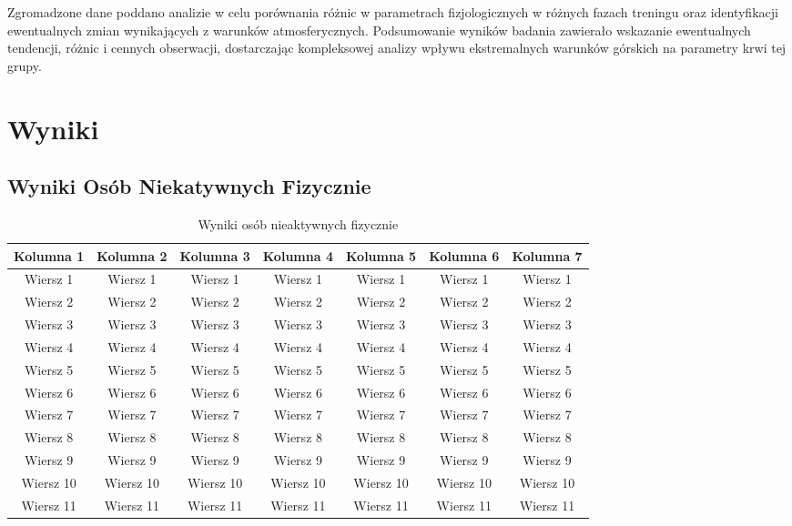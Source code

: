 Zgromadzone dane poddano analizie w celu porównania różnic w parametrach fizjologicznych w różnych fazach treningu oraz identyfikacji ewentualnych zmian wynikających z warunków atmosferycznych. Podsumowanie wyników badania zawierało wskazanie ewentualnych tendencji, różnic i cennych obserwacji, dostarczając kompleksowej analizy wpływu ekstremalnych warunków górskich na parametry krwi tej grupy.

\section{Wyniki}
\subsection{Wyniki Osób Niekatywnych Fizycznie}
\begin{table}[ht]
    \centering
    \caption{Wyniki osób nieaktywnych fizycznie}
    \label{tab:my-table}
    \begin{tabular}{|c|c|c|c|c|c|c|}
    \hline
    Kolumna 1 & Kolumna 2 & Kolumna 3 & Kolumna 4 & Kolumna 5 & Kolumna 6 & Kolumna 7 \\
    \hline
    Wiersz 1  & Wiersz 1  & Wiersz 1  & Wiersz 1  & Wiersz 1  & Wiersz 1  & Wiersz 1  \\
    \hline
    Wiersz 2  & Wiersz 2  & Wiersz 2  & Wiersz 2  & Wiersz 2  & Wiersz 2  & Wiersz 2  \\
    \hline
    Wiersz 3  & Wiersz 3  & Wiersz 3  & Wiersz 3  & Wiersz 3  & Wiersz 3  & Wiersz 3  \\
    \hline
    Wiersz 4  & Wiersz 4  & Wiersz 4  & Wiersz 4  & Wiersz 4  & Wiersz 4  & Wiersz 4  \\
    \hline
    Wiersz 5  & Wiersz 5  & Wiersz 5  & Wiersz 5  & Wiersz 5  & Wiersz 5  & Wiersz 5  \\
    \hline
    Wiersz 6  & Wiersz 6  & Wiersz 6  & Wiersz 6  & Wiersz 6  & Wiersz 6  & Wiersz 6  \\
    \hline
    Wiersz 7  & Wiersz 7  & Wiersz 7  & Wiersz 7  & Wiersz 7  & Wiersz 7  & Wiersz 7  \\
    \hline
    Wiersz 8  & Wiersz 8  & Wiersz 8  & Wiersz 8  & Wiersz 8  & Wiersz 8  & Wiersz 8  \\
    \hline
    Wiersz 9  & Wiersz 9  & Wiersz 9  & Wiersz 9  & Wiersz 9  & Wiersz 9  & Wiersz 9  \\
    \hline
    Wiersz 10 & Wiersz 10 & Wiersz 10 & Wiersz 10 & Wiersz 10 & Wiersz 10 & Wiersz 10 \\
    \hline
    Wiersz 11 & Wiersz 11 & Wiersz 11 & Wiersz 11 & Wiersz 11 & Wiersz 11 & Wiersz 11 \\

\end{tabular}
\end{table}
